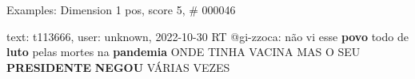 \begin{frame}{Examples: Dimension 1 pos, score 5, \# 000046}
\footnotesize
\begin{exampleblock}{text: t113666, user: unknown, 2022-10-30}
RT @gi-zzoca: não vi esse \textbf{povo} todo de \textbf{luto} pelas mortes na 
\textbf{pandemia} ONDE TINHA VACINA MAS O SEU \textbf{PRESIDENTE} 
\textbf{NEGOU} VÁRIAS VEZES 
\end{exampleblock}
\end{frame}
